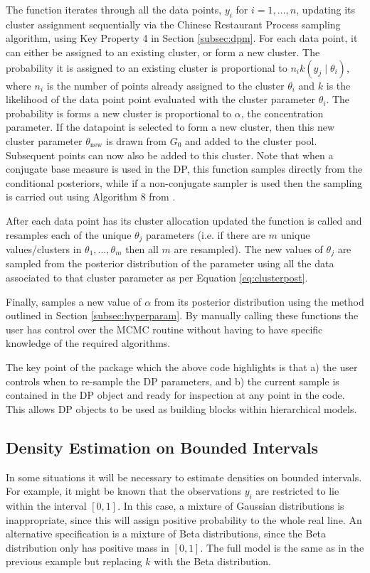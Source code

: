 \documentclass[nojss]{jss}
\begin{document}
The function  iterates through all the data points, $y_i$ for $i=1,\ldots,n$, updating its cluster assignment sequentially via the Chinese Restaurant Process sampling algorithm, using Key Property 4 in Section \ref{subsec:dpm}. For each data point, it can either be assigned to an existing cluster, or form a new cluster. The probability it is assigned to an existing cluster is proportional to $n_i k(y _j \mid \theta _{i})$, where $n_i$ is the number of points already assigned to the cluster $\theta _i$ and $k$ is the likelihood of the data point point evaluated with the cluster parameter $\theta _i$. The probability is forms a new cluster is proportional to $\alpha$, the concentration parameter. If the datapoint is selected to form a new cluster, then this new cluster parameter $\theta _{\text{new}}$ is drawn from $G_0$ and added to the cluster pool. Subsequent points can now also be added to this cluster. Note that when a conjugate base measure is used in the DP, this function samples directly from the conditional posteriors, while if a non-conjugate sampler is used then the sampling is carried out using Algorithm 8 from \cite{neal_markov_2000}.

After each data point has its cluster allocation updated the function  is called and resamples each of the unique $\theta _j$ parameters (i.e. if there are $m$ unique values/clusters in $\theta_1,\ldots,\theta_m$ then all $m$ are resampled). The new values of $\theta_j$ are sampled from the posterior distribution of the parameter using all the data associated to that cluster parameter as per Equation \eqref{eq:clusterpost}.

Finally,  samples a new value of $\alpha$ from its posterior distribution using the method outlined in Section \ref{subsec:hyperparam}. By manually calling these functions the user has control over the MCMC routine without having to have specific knowledge of the required algorithms.

The key point of the   package which the above code highlights is that a) the user controls when to re-sample the DP parameters, and b) the current sample is contained in the DP object and ready for inspection at any point in the code. This allows DP objects to be used as building blocks within hierarchical models.

\subsection{Density Estimation on Bounded Intervals}
In some situations it will be necessary to estimate densities on bounded intervals. For example, it might be known that the observations $y_i$ are restricted to lie within the interval $[0,1]$. In this case, a mixture of Gaussian distributions is inappropriate, since this will assign positive probability to the whole real line. An alternative specification is a mixture of Beta distributions, since the Beta distribution only has positive mass in $[0,1]$. The full model is the same as in the previous example but replacing $k$ with the Beta distribution.
\end{document}
